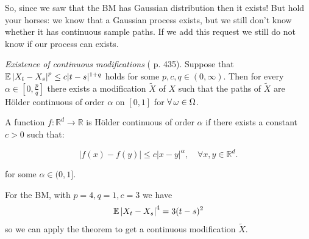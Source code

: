 \documentclass[12pt]{report}
\begin{document}
So, since we saw that the BM has Gaussian distribution then it exists! But hold your horses: we know that a Gaussian process exists, but we still don't know whether it has continuous sample paths. If we add this request we still do not know if our process can exists.
\begin{theorem}
	\emph{Existence of continuous modifications} (\cinlar{} p. 435). Suppose that $\mathbb{E}\left|X_{t}-X_{s}\right|^{p}\leq c|t-s|^{1+q}$ holds for some $p,c,q\in(0,\infty)$. Then for every $\alpha\in\left[0,\frac{p}{q}\right]$ there exists a modification $\widetilde{X}$ of $X$ such that the paths of $\widetilde{X}$ are Hölder continuous of order $\alpha$ on $[0,1]$ for $\forall\,\omega\in\Omega$.
\end{theorem}
\begin{revise}
	A function \( f: \mathbb{R}^d \to \mathbb{R} \) is Hölder continuous of order \( \alpha \) if there exists a constant \( c > 0 \) such that:
	
	\[
	|f(x) - f(y)| \leq c |x - y|^\alpha, \quad \forall x, y \in \mathbb{R}^d.
	\]
	
	for some \( \alpha \in (0,1] \).
\end{revise}
\begin{remark}
	For the BM, with $p=4, q=1, c=3$ we have
	\begin{equation*}
		\mathbb{E}\left|X_{t}-X_{s}\right|^{4}=3(t-s)^{2}
	\end{equation*}
	so we can apply the theorem to get a continuous modification $\widetilde{X}$.
\end{remark}
\end{document}

